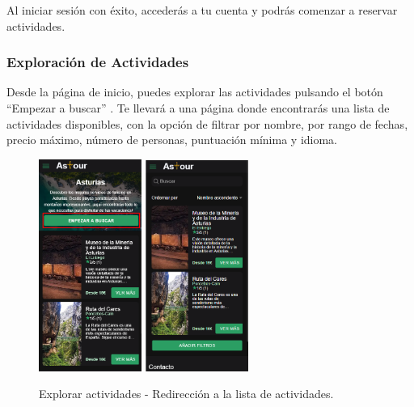 Al iniciar sesión con éxito, accederás a tu cuenta y podrás comenzar a reservar actividades.

\subsubsection{Exploración de Actividades}
Desde la página de inicio, puedes explorar las actividades pulsando el botón “Empezar a buscar” .
Te llevará a una página donde encontrarás una lista de actividades disponibles, con la opción de filtrar por nombre, por rango de fechas, precio máximo, número de personas, puntuación mínima y idioma.
\begin{figure}[H]
	\centering
	\includegraphics[width=0.3\textwidth]{7-Construccion/Manuales/mobile/empezar a buscar.png}
	\includegraphics[width=0.3\textwidth]{7-Construccion/Manuales/mobile/lista de actividades.png}
	\caption{Explorar actividades - Redirección a la lista de actividades.}
\end{figure}

